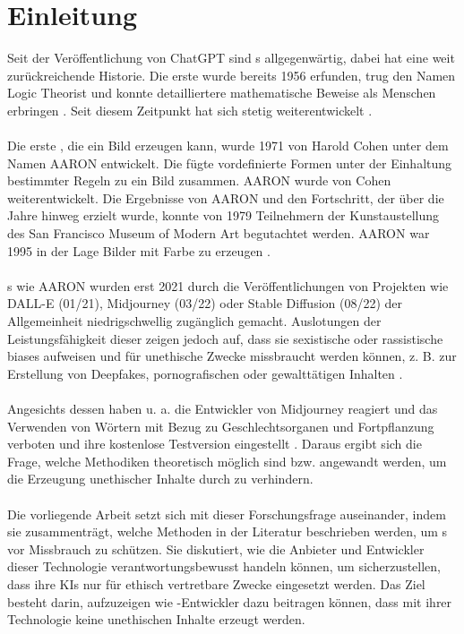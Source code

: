 \documentclass[hidelinks,12pt]{report}
\begin{document}
\chapter{Einleitung}
Seit der Veröffentlichung von ChatGPT sind  s allgegenwärtig, dabei hat  eine weit zurückreichende Historie. Die erste  wurde bereits 1956 erfunden, trug den Namen Logic Theorist und konnte detailliertere mathematische Beweise als Menschen erbringen \cite{LogicTheorist}. Seit diesem Zeitpunkt hat sich  stetig weiterentwickelt \cite{HistoryAI}.
\\\\
Die erste , die ein Bild erzeugen kann, wurde 1971 von Harold Cohen unter dem Namen AARON entwickelt. Die  fügte vordefinierte Formen unter der Einhaltung bestimmter Regeln zu ein Bild zusammen. AARON wurde von Cohen weiterentwickelt. Die Ergebnisse von AARON und den Fortschritt, der über die Jahre hinweg erzielt wurde, konnte von 1979 Teilnehmern der Kunstaustellung des San Francisco Museum of Modern Art begutachtet werden. AARON war 1995 in der Lage Bilder mit Farbe zu erzeugen \cite{Garcia}.
\\\\
s wie AARON wurden erst 2021 durch die Veröffentlichungen von Projekten wie DALL-E (01/21), Midjourney (03/22) oder Stable Diffusion (08/22) der Allgemeinheit niedrigschwellig zugänglich gemacht. Auslotungen der Leistungsfähigkeit dieser  zeigen jedoch auf, dass sie sexistische oder rassistische \Gls{bias}es aufweisen \cite{Schmidt} und für unethische Zwecke missbraucht werden können, z. B. zur Erstellung von Deepfakes, pornografischen oder gewalttätigen Inhalten \cite{Hadero}.
\\\\
Angesichts dessen haben u. a. die Entwickler von Midjourney reagiert und das Verwenden von Wörtern mit Bezug zu Geschlechtsorganen und Fortpflanzung verboten \cite{Heikkilae} und ihre kostenlose Testversion eingestellt \cite{NelsonMidjourney}. Daraus ergibt sich die Frage, welche Methodiken theoretisch möglich sind bzw. angewandt werden, um die Erzeugung unethischer Inhalte durch  zu verhindern.
\\\\
Die vorliegende Arbeit setzt sich mit dieser Forschungsfrage auseinander, indem sie zusammenträgt, welche Methoden in der Literatur beschrieben werden, um s vor Missbrauch zu schützen. Sie diskutiert, wie die Anbieter und Entwickler dieser Technologie verantwortungsbewusst handeln können, um sicherzustellen, dass ihre KIs nur für ethisch vertretbare Zwecke eingesetzt werden. Das Ziel besteht darin, aufzuzeigen wie -Entwickler dazu beitragen können, dass mit ihrer Technologie keine unethischen Inhalte erzeugt werden.
\end{document}
